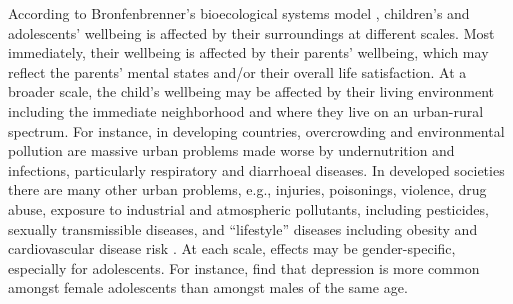 \documentclass[11pt, letterpaper]{article}
\begin{document}
\begin{spacing}{1.9}
According to Bronfenbrenner's bioecological systems model
\citep{bronfenbrenner2007}, children's and adolescents' wellbeing is affected by
their surroundings at different scales. Most immediately, their wellbeing is
affected by their parents' wellbeing, which may reflect the parents' mental
states and/or their overall life satisfaction. At a broader scale, the child's
wellbeing may be affected by their living environment including the immediate
neighborhood and where they live on an urban-rural spectrum. 
 For instance, in developing countries, 
overcrowding and environmental pollution are massive urban problems made worse by
undernutrition and infections, particularly respiratory and diarrhoeal
diseases. In developed societies there are many other urban problems, e.g., injuries,
poisonings, violence, drug abuse, exposure to industrial and atmospheric
pollutants, including pesticides, sexually transmissible diseases, and
``lifestyle'' diseases including obesity and cardiovascular disease risk \citep{gracey2002child}.
At each scale, effects may be gender-specific, especially for adolescents. For
instance, \citet{nolen2016} find that depression is more common amongst female
adolescents than amongst males of the same age.


\end{spacing}
\end{document}
